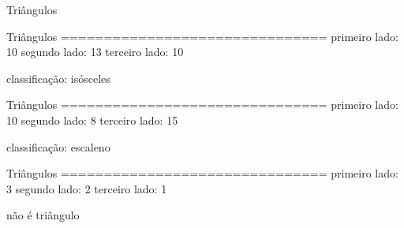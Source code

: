 \documentclass[11pt]{practice}
\begin{document}
\begin{task}[breakable]{Triângulos}{}
  \begin{runexample}
Triângulos
===============================
primeiro lado: 10
segundo lado: 13
terceiro lado: 10

classificação: isósceles
   \end{runexample}

  \begin{runexample}
Triângulos
===============================
primeiro lado: 10
segundo lado: 8
terceiro lado: 15

classificação: escaleno
  \end{runexample}

  \begin{runexample}
Triângulos
===============================
primeiro lado: 3
segundo lado: 2
terceiro lado: 1

não é triângulo
  \end{runexample}

  \tcblower
  \solution
\end{task}


  



\end{document}
